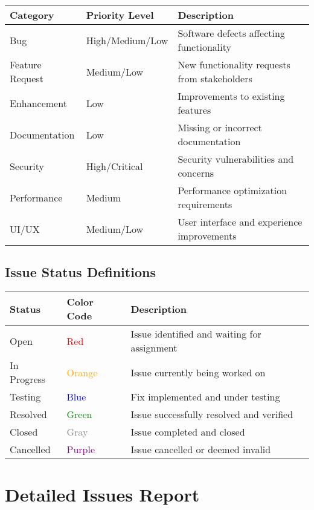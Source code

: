 \documentclass[12pt,a4paper]{article}
\begin{document}
\begin{longtable}{|p{2.5cm}|p{2.5cm}|p{7.5cm}|}
\hline
\textbf{Category} & \textbf{Priority Level} & \textbf{Description} \\
\hline
Bug & High/Medium/Low & Software defects affecting functionality \\
\hline
Feature Request & Medium/Low & New functionality requests from stakeholders \\
\hline
Enhancement & Low & Improvements to existing features \\
\hline
Documentation & Low & Missing or incorrect documentation \\
\hline
Security & High/Critical & Security vulnerabilities and concerns \\
\hline
Performance & Medium & Performance optimization requirements \\
\hline
UI/UX & Medium/Low & User interface and experience improvements \\
\hline
\end{longtable}

\subsection{Issue Status Definitions}

\begin{longtable}{|p{1.8cm}|p{2.5cm}|p{8.2cm}|}
\hline
\textbf{Status} & \textbf{Color Code} & \textbf{Description} \\
\hline
Open & \textcolor{red}{Red} & Issue identified and waiting for assignment \\
\hline
In Progress & \textcolor{orange}{Orange} & Issue currently being worked on \\
\hline
Testing & \textcolor{blue}{Blue} & Fix implemented and under testing \\
\hline
Resolved & \textcolor{green}{Green} & Issue successfully resolved and verified \\
\hline
Closed & \textcolor{gray}{Gray} & Issue completed and closed \\
\hline
Cancelled & \textcolor{purple}{Purple} & Issue cancelled or deemed invalid \\
\hline
\end{longtable}

\section{Detailed Issues Report}
\end{document}
